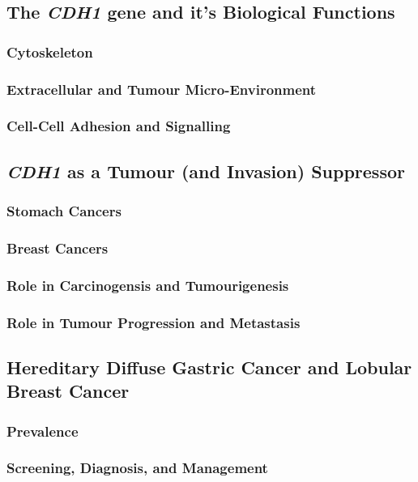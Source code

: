 \subsection{The \textit{CDH1} gene and it's Biological Functions}
\subsubsection{Cytoskeleton}
\subsubsection{Extracellular and Tumour Micro-Environment}
\subsubsection{Cell-Cell Adhesion and Signalling}

\subsection{\textit{CDH1} as a Tumour (and Invasion) Suppressor}
\subsubsection{Stomach Cancers}
\subsubsection{Breast Cancers}
\subsubsection{Role in Carcinogensis and Tumourigenesis}
\subsubsection{Role in Tumour Progression and Metastasis}


\subsection{Hereditary Diffuse Gastric Cancer and Lobular Breast Cancer}
\subsubsection{Prevalence}
\subsubsection{Screening, Diagnosis, and Management}
